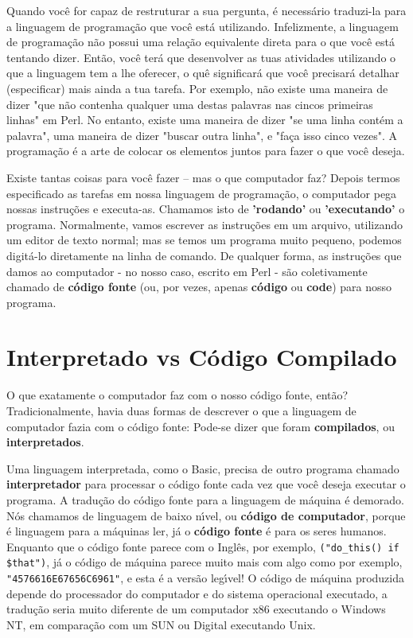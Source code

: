 \documentclass[a4paper,12pt,twoside]{book}
\begin{document}
\noindent Quando voc\^e for capaz de restruturar a sua pergunta, \'e necess\'ario traduzi-la 
para a linguagem de programa\c{c}\~ao que voc\^e est\'a utilizando. Infelizmente, a linguagem 
de programa\c{c}\~ao n\~ao possui uma rela\c{c}\~ao equivalente direta para o que voc\^e est\'a 
tentando dizer. Ent\~ao, voc\^e ter\'a que desenvolver as tuas atividades utilizando o que a 
linguagem tem a lhe oferecer, o qu\^e significar\'a que voc\^e precisar\'a detalhar (especificar) 
mais ainda a tua tarefa. Por exemplo, n\~ao existe uma maneira de dizer "que n\~ao contenha 
qualquer uma destas palavras nas cincos primeiras linhas" em Perl. No entanto, existe uma maneira 
de dizer "se uma linha cont\'em a palavra", uma maneira de dizer "buscar outra linha", e 
"fa\c{c}a isso cinco vezes". A programa\c{c}\~ao \'e a arte de colocar os elementos juntos para 
fazer o que voc\^e deseja.\medskip

\noindent Existe tantas coisas para voc\^e fazer – mas o que computador faz? Depois termos 
especificado as tarefas em nossa linguagem de programa\c{c}\~ao, o computador pega nossas 
instru\c{c}\~oes e executa-as. Chamamos isto de \textbf{'rodando'} ou \textbf{'executando'} 
o programa. Normalmente, vamos escrever as instru\c{c}\~oes em um arquivo, utilizando um editor 
de texto normal; mas se temos um programa muito pequeno, podemos digit\'a-lo diretamente na 
linha de comando. De qualquer forma, as instru\c{c}\~oes que damos ao computador - no nosso 
caso, escrito em Perl - s\~ao coletivamente chamado de \textbf{c\'odigo fonte} (ou, por vezes, 
apenas \textbf{c\'odigo} ou \textbf{code}) para nosso programa.

\section{Interpretado vs C\'odigo Compilado}

\noindent O que exatamente o computador faz com o nosso c\'odigo fonte, ent\~ao? Tradicionalmente, 
havia duas formas de descrever o que a linguagem de computador fazia com o c\'odigo fonte: Pode-se 
dizer que foram \textbf{compilados}, ou \textbf{interpretados}.\medskip

\noindent Uma linguagem interpretada, como o Basic, precisa de outro programa chamado \textbf{interpretador} 
para processar o c\'odigo fonte cada vez que voc\^e deseja executar o programa. A tradu\c{c}\~ao do c\'odigo 
fonte para a linguagem de m\'aquina \'e demorado. N\'os chamamos de linguagem de baixo n\'{\i}vel, 
ou \textbf{c\'odigo de computador}, porque \'e linguagem para a m\'aquinas ler, j\'a o \textbf{c\'odigo fonte}
\'e para os seres humanos. Enquanto que o c\'odigo fonte parece com o Ingl\^es, por exemplo, 
\texttt{("do\_this() if \$that")}, j\'a o c\'odigo de m\'aquina parece muito mais com algo como por exemplo, 
\texttt{"4576616E67656C6961"}, e esta \'e a vers\~ao leg\'{\i}vel! O c\'odigo de m\'aquina produzida depende 
do processador do computador e do sistema operacional executado, a tradu\c{c}\~ao seria muito diferente de um 
computador x86 executando o Windows NT, em compara\c{c}\~ao com um SUN ou Digital executando Unix.\medskip
\end{document}
